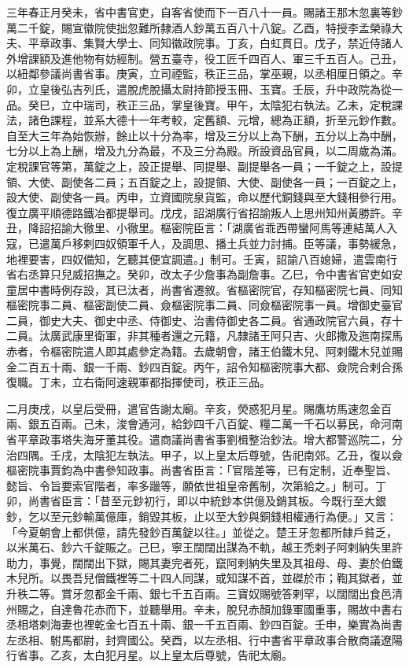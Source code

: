 \begin{pinyinscope}
 三年春正月癸未，省中書官吏，自客省使而下一百八十一員。賜諸王那木忽裏等鈔萬二千錠，賜宣徽院使拙忽難所隸酒人鈔萬五百八十八錠。乙酉，特授李孟榮祿大夫、平章政事、集賢大學士、同知徽政院事。丁亥，白虹貫日。戊子，禁近侍諸人外增課額及進他物有妨經制。營五臺寺，役工匠千四百人、軍三千五百人。己丑，以紐鄰參議尚書省事。庚寅，立司禋監，秩正三品，掌巫覡，以丞相厘日領之。辛卯，立皇後弘吉列氏，遣脫虎脫攝太尉持節授玉冊、玉寶。壬辰，升中政院為從一品。癸巳，立中瑞司，秩正三品，掌皇後寶。甲午，太陰犯右執法。乙未，定稅課法，諸色課程，並系大德十一年考較，定舊額、元增，總為正額，折至元鈔作數。自至大三年為始恢辦，餘止以十分為率，增及三分以上為下酬，五分以上為中酬，七分以上為上酬，增及九分為最，不及三分為殿。所設資品官員，以二周歲為滿。定稅課官等第，萬錠之上，設正提舉、同提舉、副提舉各一員；一千錠之上，設提領、大使、副使各二員；五百錠之上，設提領、大使、副使各一員；一百錠之上，設大使、副使各一員。丙申，立資國院泉貨監，命以歷代銅錢與至大錢相參行用。復立廣平順德路鐵冶都提舉司。戊戌，詔湖廣行省招諭叛人上思州知州黃勝許。辛丑，降詔招諭大徹里、小徹里。樞密院臣言：「湖廣省乖西帶蠻阿馬等連結萬人入寇，已遣萬戶移剌四奴領軍千人，及調思、播土兵並力討捕。臣等議，事勢緩急，地裡要害，四奴備知，乞聽其便宜調遣。」制可。壬寅，詔諭八百媳婦，遣雲南行省右丞算只兒威招撫之。癸卯，改太子少詹事為副詹事。乙巳，令中書省官吏如安童居中書時例存設，其已汰者，尚書省遷敘。省樞密院官，存知樞密院七員、同知樞密院事二員、樞密副使二員、僉樞密院事二員、同僉樞密院事一員。增御史臺官二員，御史大夫、御史中丞、侍御史、治書侍御史各二員。省通政院官六員，存十二員。汰廣武康里衛軍，非其種者還之元籍，凡隸諸王阿只吉、火郎撒及迤南探馬赤者，令樞密院遣人即其處參定為籍。去歲朝會，諸王伯鐵木兒、阿剌鐵木兒並賜金二百五十兩、銀一千兩、鈔四百錠。丙午，詔令知樞密院事大都、僉院合剌合孫復職。丁未，立右衛阿速親軍都指揮使司，秩正三品。



 二月庚戌，以皇后受冊，遣官告謝太廟。辛亥，熒惑犯月星。賜鷹坊馬速忽金百兩、銀五百兩。己未，浚會通河，給鈔四千八百錠、糧二萬一千石以募民，命河南省平章政事塔失海牙董其役。遣商議尚書省事劉楫整治鈔法。增大都警巡院二，分治四隅。壬戌，太陰犯左執法。甲子，以上皇太后尊號，告祀南郊。乙丑，復以僉樞密院事賈鈞為中書參知政事。尚書省臣言：「官階差等，已有定制，近奉聖旨、懿旨、令旨要索官階者，率多躐等，願依世祖皇帝舊制，次第給之。」制可。丁卯，尚書省臣言：「昔至元鈔初行，即以中統鈔本供億及銷其板。今既行至大銀鈔，乞以至元鈔輸萬億庫，銷毀其板，止以至大鈔與銅錢相權通行為便。」又言：「今夏朝會上都供億，請先發鈔百萬錠以往。」並從之。楚王牙忽都所隸戶貧乏，以米萬石、鈔六千錠賑之。己巳，寧王闊闊出謀為不軌，越王禿剌子阿剌納失里許助力，事覺，闊闊出下獄，賜其妻完者死，竄阿剌納失里及其祖母、母、妻於伯鐵木兒所。以畏吾兒僧鐵裡等二十四人同謀，或知謀不首，並磔於市；鞫其獄者，並升秩二等。賞牙忽都金千兩、銀七千五百兩。三寶奴賜號答剌罕，以闊闊出食邑清州賜之，自達魯花赤而下，並聽舉用。辛未，脫兒赤顏加錄軍國重事，賜故中書右丞相塔剌海妻也裡乾金七百五十兩、銀一千五百兩、鈔四百錠。壬申，樂實為尚書左丞相、駙馬都尉，封齊國公。癸酉，以左丞相、行中書省平章政事合散商議遼陽行省事。乙亥，太白犯月星。以上皇太后尊號，告祀太廟。




\end{pinyinscope}
